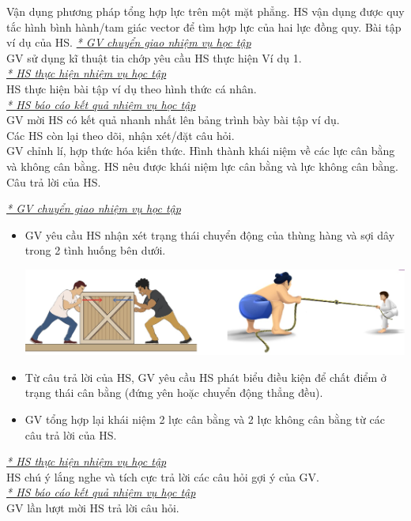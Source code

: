 \hoatdong
{Vận dụng phương pháp tổng hợp lực trên một mặt phẳng.
}
{HS vận dụng được quy tắc hình bình hành/tam giác vector để tìm hợp lực của hai lực đồng quy.
}
{Bài tập ví dụ của HS.
}
{\textit{\underline{* GV chuyển giao nhiệm vụ học tập}}\\
	GV sử dụng kĩ thuật tia chớp yêu cầu HS thực hiện Ví dụ 1.\\
	\textit{\underline{* HS thực hiện nhiệm vụ học tập}}\\
	HS thực hiện bài tập ví dụ theo hình thức cá nhân.\\
	\textit{\underline{* HS báo cáo kết quả nhiệm vụ học tập}}\\
	GV mời HS có kết quả nhanh nhất lên bảng trình bày bài tập ví dụ.\\
	Các HS còn lại theo dõi, nhận xét/đặt câu hỏi.\\
	GV chỉnh lí, hợp thức hóa kiến thức.
}
\hoatdong
{Hình thành khái niệm về các lực cân bằng và không cân bằng.
}
{HS nêu được khái niệm lực cân bằng và lực không cân bằng.
}
{Câu trả lời của HS.
}
{\textit{\underline{* GV chuyển giao nhiệm vụ học tập}}
	\begin{itemize}[label=-]
		\item GV yêu cầu HS nhận xét trạng thái chuyển động của thùng hàng và sợi dây trong 2 tình huống bên dưới.
		\begin{center}
			\includegraphics[scale=0.5]{figs/G10-BAI9-6}
		\end{center}
		\item Từ câu trả lời của HS, GV yêu cầu HS phát biểu điều kiện để chất điểm ở trạng thái cân bằng (đứng yên hoặc chuyển động thẳng đều).
		\item GV tổng hợp lại khái niệm 2 lực cân bằng và 2 lực không cân bằng từ các câu trả lời của HS.
	\end{itemize}
	\textit{\underline{* HS thực hiện nhiệm vụ học tập}}\\
	HS chú ý lắng nghe và tích cực trả lời các câu hỏi gợi ý của GV.\\
	\textit{\underline{* HS báo cáo kết quả nhiệm vụ học tập}}\\
	GV lần lượt mời HS trả lời câu hỏi.
}
